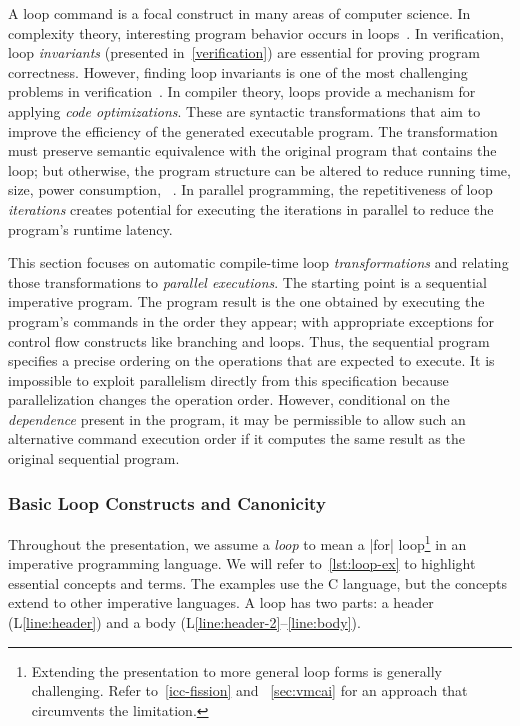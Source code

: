 A loop command is a focal construct in many areas of computer science.
In complexity theory, interesting program behavior occurs in loops~\cite{benamram2020,jones2009}.
In verification, loop \emph{invariants} (presented in~\autoref{verification}) are essential for proving program correctness.
However, finding loop invariants is one of the most challenging problems in verification~\cite{dillig2013,si2018,yu2023}.
In compiler theory, loops provide a mechanism for applying \emph{code optimizations}.
These are syntactic transformations that aim to improve the efficiency of the generated executable program.
The transformation must preserve semantic equivalence with the original program that contains the loop;
but otherwise, the program structure can be altered to reduce running time, size, power consumption, \etc~\cite[p. 10]{alfred2007}.
In parallel programming, the repetitiveness of loop \emph{iterations} creates potential for executing the iterations in parallel to reduce the program's runtime latency.

This section focuses on automatic compile-time loop \emph{transformations} and relating those transformations to \emph{parallel executions}.
The starting point is a sequential imperative program.
The program result is the one obtained by executing the program's commands in the order they appear;
with appropriate exceptions for control flow constructs like branching and loops.
Thus, the sequential program specifies a precise ordering on the operations that are expected to execute.
It is impossible to exploit parallelism directly from this specification because parallelization changes the operation order.
However, conditional on the \emph{dependence} present in the program,
it may be permissible to allow such an alternative command execution order if it computes the same result as the original sequential program.

\subsubsection{Basic Loop Constructs and Canonicity}
\label{loop-constructs}

Throughout the presentation, we assume a \emph{loop} to mean a \pr|for| loop\footnote{
Extending the presentation to more general loop forms is generally challenging.
Refer to~\autoref{icc-fission} and ~\autoref{sec:vmcai} for an approach that circumvents the limitation.}
in an imperative programming language.
We will refer to~\autoref{lst:loop-ex} to highlight essential concepts and terms.
The examples use the C language, but the concepts extend to other imperative languages.
A {loop} has two parts: a header (L\ref{line:header}) and a body (L\ref{line:header-2}--\ref{line:body}).

